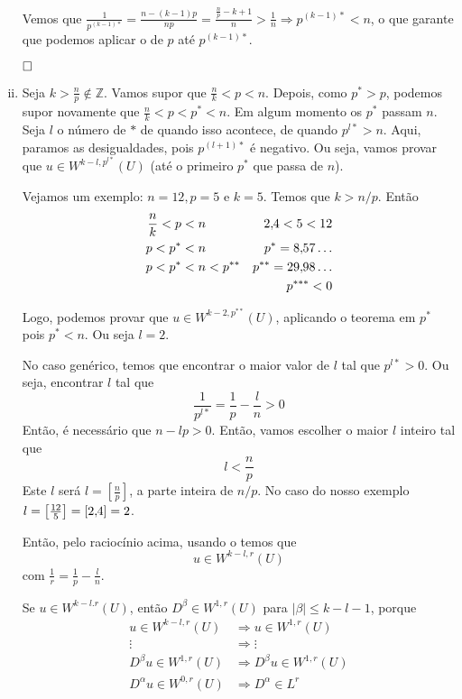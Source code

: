 \documentclass[a4paper, 11pt]{article}
\newcommand{\qed}{$\hfill\square$}
\newcommand{\Z}{\mathbb{Z}}
\renewcommand{\v}{,\hspace{-2pt}}
\begin{document}
\begin{enumerate}[(i)]
	Vemos que $ \frac{1}{p^{(k-1)*}} = \frac{n-(k-1)p}{np} = \frac{\frac{n}{p} - k + 1}{n} > \frac{1}{n} \Rightarrow p^{(k-1)*} < n$, o que garante que podemos aplicar o  de $p$ até $p^{(k-1)*}$.
	
	\qed
	
	
	\item Seja $k > \frac{n}{p} \notin \Z$. Vamos supor que $\frac{n}{k} < p < n$. Depois, como $p^* > p$, podemos supor novamente que $\frac{n}{k} < p < p^* < n$. Em algum momento os $p^*$ passam $n$. Seja $l$ o número de $*$ de quando isso acontece, de quando $p^{l*}>n$. Aqui, paramos as desigualdades, pois $p^{(l+1)*}$ é negativo. Ou seja, vamos provar que $u \in W^{k-l,p^{l*}}(U)$ (até o primeiro $p^*$ que passa de $n$).
	
	Vejamos um exemplo: $n=12, p=5$ e $k=5$. Temos que $k>n/p$. Então \begin{align*}
		\frac{n}{k} < p &< n & 2\v4 < 5 < 12\\
		p < p^* &< n & p^* = 8\v57\ldots\\
		p < p^* &< n < p^{**} & p^{**} = 29\v98\ldots \\
		&& p^{***} < 0 
	\end{align*}

	Logo, podemos provar que $u \in W^{k-2, p^{**}}(U)$, aplicando o teorema em $p^*$ pois $p^* < n$. Ou seja $l=2$.
	
	No caso genérico, temos que encontrar o maior valor de $l$ tal que $p^{l*}>0$. Ou seja, encontrar $l$ tal que \[ \frac{1}{p^{l*}} = \frac{1}{p} - \frac{l}{n} > 0  \] Então, é necessário que $n - lp >0$. Então, vamos escolher o maior $l$ inteiro tal que \[ l < \frac{n}{p} \] Este $l$ será $l= \left[\frac{n}{p}\right]$, a parte inteira de $n/p$. No caso do nosso exemplo $l=\left[\frac{12}{5}\right] = \left[2\v 4\right] = 2$.
	
	Então, pelo raciocínio acima, usando o  temos que \[  u \in W^{k-l,r}(U)   \]com $ \frac{1}{r} = \frac{1}{p} - \frac{l}{n} $.
	
	Se $u \in W^{k-l. r}(U)$, então $D^\beta \in W^{1,r}(U)$ para $|\beta|\leq k-l-1$, porque \begin{align*}
		u \in W^{k-l,r}(U) &\Rightarrow u \in W^{1,r}(U)\\
		\vdots & \Rightarrow \vdots \\
		D^\beta u \in W^{1,r}(U) &\Rightarrow D^\beta u \in W^{1,r}(U) \\
		D^\alpha u \in W^{0,r}({U}) &\Rightarrow D^\alpha \in L^r 
	\end{align*}


\end{enumerate}
\end{document}
